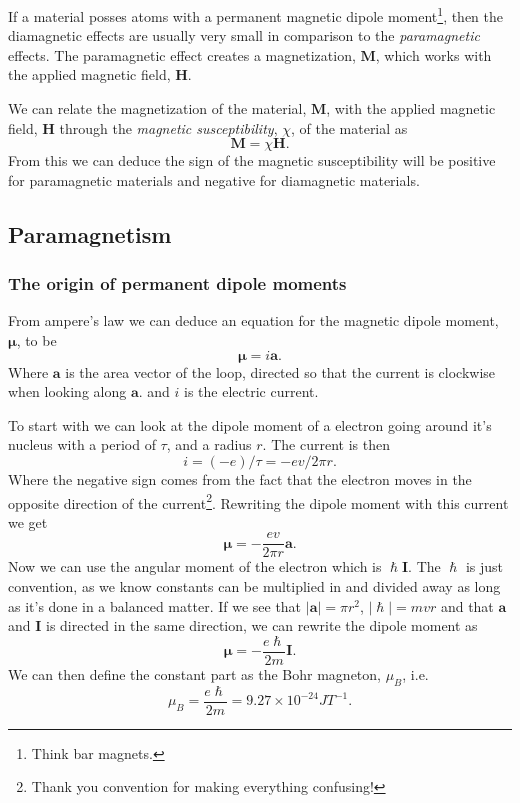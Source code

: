 \documentclass[11pt]{article}
\begin{document}
If a material posses atoms with a permanent magnetic dipole moment\footnote{Think bar magnets.}, then the diamagnetic effects are usually very small in comparison to the \emph{paramagnetic} effects. The paramagnetic effect creates a magnetization, $\mathbf{M}$, which works with the applied magnetic field, $\mathbf{H}$. 

We can relate the magnetization of the material, $\mathbf{M}$, with the applied magnetic field, $\mathbf{H}$ through the \emph{magnetic susceptibility}, $\chi$, of the material as 
\begin{equation}
	\mathbf{M} = \chi \mathbf{H}.
\end{equation}
From this we can deduce the sign of the magnetic susceptibility will be positive for paramagnetic materials and negative for diamagnetic materials. 

\subsection{Paramagnetism}
\subsubsection{The origin of permanent dipole moments}
From ampere's law we can deduce an equation for the magnetic dipole moment, $\pmb{\mu}$, to be
\begin{equation}
	\pmb{\mu} = i \pmb{a}.
\end{equation}
Where $\pmb{a}$ is the area vector of the loop, directed so that the current is clockwise when looking along $\pmb{a}$. and $i$ is the electric current.

To start with we can look at the dipole moment of a electron going around it's nucleus with a period of $\tau$, and a radius $r$. The current is then 
\begin{equation}
	i = (-e)/\tau = -e v/2\pi r.
\end{equation}
Where the negative sign comes from the fact that the electron moves in the opposite direction of the current\footnote{Thank you convention for making everything confusing!}. Rewriting the dipole moment with this current we get
\begin{equation}
	\pmb{\mu} = - \frac{ev}{2\pi r} \pmb{a}.
\end{equation}
Now we can use the angular moment of the electron which is $\hslash \pmb{I}$. The $\hslash$ is just convention, as we know constants can be multiplied in and divided away as long as it's done in a balanced matter. If we see that $|\pmb{a}| = \pi r^2$, $|\hslash| = mvr$ and that $\pmb{a}$ and $\pmb{I}$ is directed in the same direction, we can rewrite the dipole moment as
\begin{equation}
	\pmb{\mu} = - \frac{e\hslash}{2m} \pmb{I}.
	\label{eq:orbital_momentum}
\end{equation}
We can then define the constant part as the Bohr magneton, $\mu_B$, i.e.
\begin{equation}
	\mu_B = \frac{e\hslash}{2m} = 9.27 \times 10^{-24} J T^{-1}.
\end{equation}
\end{document}
